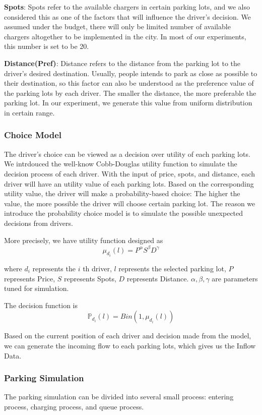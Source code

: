 \textbf{Spots}: Spots refer to the available chargers in certain parking lots, and we also considered this as one of the factors that will influence the driver's decision. We assumed under the budget, there will only be limited number of available chargers altogether to be implemented in the city. In most of our experiments, this number is set to be 20. 

\textbf{Distance(Pref)}: Distance refers to the distance from the parking lot to the driver's desired destination. Usually, people intends to park as close as possible to their destination, so this factor can also be understood as the preference value of the parking lots by each driver. The smaller the distance, the more preferable the parking lot. In our experiment, we generate this value from uniform distribution in certain range. 

\subsubsection{Choice Model}

The driver's choice can be viewed as a decision over utility of each parking lots. We intrdouced the well-know Cobb-Douglas utility function to simulate the decision process of each driver. With the input of price, spots, and distance, each driver will have an utility value of each parking lots. Based on the corresponding utility value, the driver will make a probability-based choice: The higher the value, the more possible the driver will choose certain parking lot. The reason we introduce the probability choice model is to simulate the possible unexpected decisions from drivers. 

More precisely, we have
utility function designed as
$$
\mu_{d_i}(l) = P^{\alpha} S^{\beta} D^{\gamma}
$$

where $d_i$ represents the $i$ th driver, $l$ represents the selected parking lot, $P$ represents Price, $S$ represents Spots, $D$ represents Distance. $\alpha, \beta, \gamma$ are parameters tuned for simulation. 

The decision function is 
$$
\mathbb{P}_{d_i}(l) = Bin(1, \mu_{d_i}(l))
$$

Based on the current position of each driver and decision made from the model, we can generate the incoming flow to each parking lots, which gives us the Inflow Data. 


\subsubsection{Parking Simulation}
The parking simulation can be divided into several small process: entering process, charging process, and queue process.

